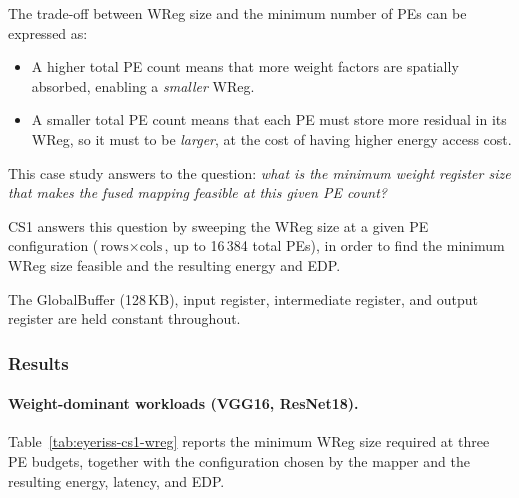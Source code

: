 The trade-off between WReg size and the minimum number
of PEs can be expressed as:
%
\begin{itemize}
  \item A higher total PE count means that more weight factors are spatially absorbed, enabling a \emph{smaller} WReg.
  \item A smaller total PE count means that each PE must store more residual in its WReg, so it must to be \emph{larger}, at the cost of having higher energy access cost.
\end{itemize}

This case study answers to the question: \emph{what is the minimum weight register size that makes the
fused mapping feasible at this given PE count?}

CS1 answers this question by sweeping the WReg size at a given PE configuration ($\text{rows} \times \text{cols}$, up
to 16\,384 total PEs), in order to find the minimum WReg size feasible and the resulting energy and EDP.

The GlobalBuffer (128\,KB), input register, intermediate register, and
output register are held constant throughout.

\subsubsection{Results}

\paragraph{Weight-dominant workloads (VGG16, ResNet18).}

Table~\ref{tab:eyeriss-cs1-wreg} reports the minimum WReg size
required at three PE budgets, together with the configuration chosen
by the mapper and the resulting energy, latency, and EDP.

